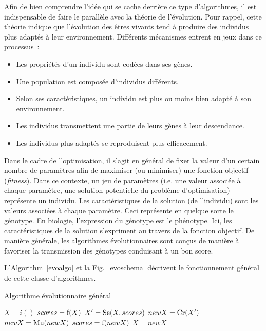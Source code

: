 \documentclass[a4paper, 12pt]{report}
\begin{document}
Afin de bien comprendre l'idée qui se cache derrière ce type d'algorithmes, il est indispensable de faire le parallèle avec la théorie de l'évolution. Pour rappel, cette théorie indique que l'évolution des êtres vivants tend à produire des individus plus adaptés à leur environnement. Différents mécanismes entrent en jeux dans ce processus~\cite{WIKI_EVO}:
\begin{itemize}
\item Les propriétés d'un individu sont codées dans ses gènes.
\item Une population est composée d'individus différents.
\item Selon ses caractéristiques, un individu est plus ou moins bien adapté à son environnement.
\item Les individus transmettent une partie de leurs gènes à leur descendance.
\item Les individus plus adaptés se reproduisent plus efficacement.
\end{itemize}

Dans le cadre de l'optimisation, il s'agit en général de fixer la valeur d'un certain nombre de paramètres afin de maximiser (ou minimiser) une fonction objectif (\textit{fitness}). Dans ce contexte, un jeu de paramètres (i.e. une valeur associée à chaque paramètre, une solution potentielle du problème d'optimisation) représente un individu. Les caractéristiques de la solution (de l'individu) sont les valeurs associées à chaque paramètre. Ceci représente en quelque sorte le génotype. En biologie, l'expression du génotype est le phénotype. Ici, les caractéristiques de la solution s'expriment au travers de la fonction objectif. De manière générale, les algorithmes évolutionnaires sont conçus de manière à favoriser la transmission des génotypes conduisant à un bon score.  

L'Algorithm~\ref{evoalgo} et la Fig.~\ref{evoschema} décrivent le fonctionnement général de cette classe d'algorithmes.
\begin{algorithm}[!b]                      
\caption{Algorithme évolutionnaire général~\cite{WIKI_EVO}}          
\label{evoalgo}                           
\begin{algorithmic}                    
\STATE $X = i()$ 
\STATE $scores = \textnormal{f}(X)$ 
\STATE $X' = \textnormal{Se}(X, scores)$ 
\STATE $newX = \textnormal{Cr}(X')$  
\STATE $newX = \textnormal{Mu}(newX)$ 
\STATE $scores = \textnormal{f}(newX)$ 
\STATE $X = newX$ 
\ENDWHILE
\end{algorithmic}
\end{algorithm}
\end{document}
